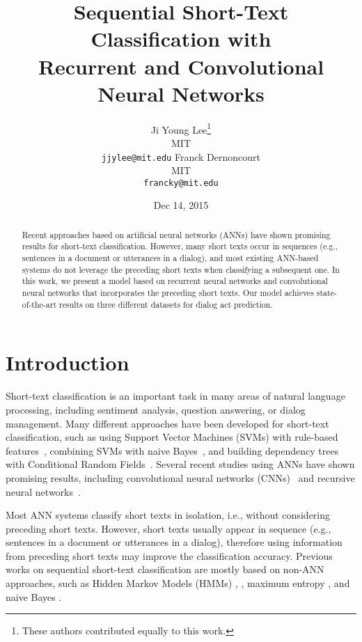 \documentclass[11pt,letterpaper]{article}
\title{Sequential Short-Text Classification with \\Recurrent and Convolutional Neural Networks}
\author{Ji Young Lee\thanks{\hspace{3mm}These authors contributed equally to this work.}\\
	    MIT\\
	    {\tt jjylee@mit.edu}
	   \And
	 Franck Dernoncourt\footnotemark[1]\\
   	MIT\\
   {\tt francky@mit.edu}}
\date{Dec 14, 2015}
\begin{document}
\maketitle
{}


\vspace{-0.5cm}




\begin{abstract}
\vspace{-0.2cm}Recent approaches based on artificial neural networks (ANNs) have shown promising results for short-text classification. 
However, many short texts occur in sequences (e.g., sentences in a document or utterances in a dialog), and most existing ANN-based systems do not leverage the preceding short texts when classifying a subsequent one.
In this work, we present a model based on recurrent neural networks and convolutional neural networks that incorporates the preceding short texts. 
Our model achieves state-of-the-art results on three different datasets for dialog act prediction.
\end{abstract}




 \section{Introduction}


Short-text classification is an important task in many areas of natural language processing, including sentiment analysis, question answering, or dialog management. Many different approaches have been developed for short-text classification, such as using Support Vector Machines (SVMs) with rule-based features~\cite{silva2011symbolic}, combining SVMs with naive Bayes~\cite{wang2012baselines}, and building dependency trees with Conditional Random Fields~\cite{nakagawa2010dependency}. Several recent studies using ANNs have shown promising results, including convolutional neural networks (CNNs)~\cite{kim2014convolutional,blunsom2014convolutional,kalchbrenner2014convolutional} and recursive neural networks~\cite{socher2012semantic}.




Most ANN systems classify short texts in isolation, i.e., without considering preceding short texts.
However, short texts usually appear in sequence (e.g., sentences in a document or utterances in a dialog), therefore using information from preceding short texts may improve the classification accuracy.
Previous works on sequential short-text classification are mostly based on non-ANN approaches, such as Hidden Markov Models (HMMs) \cite{reithinger1997dialogue}, \cite{stolcke2000dialogue},
maximum entropy \cite{ang2005automatic}, and naive Bayes \cite{lendvai2007token}. 
\end{document}
